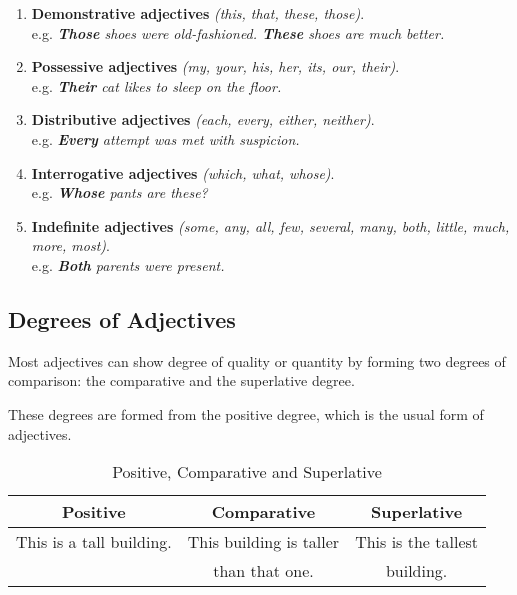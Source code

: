 \documentclass[hidelinks,10pt,a4paper]{article}
\begin{document}
\begin{enumerate}[label=(\alph*)]
	\item \textbf{Demonstrative adjectives} \textit{(this, that, these, those)}. \\
		e.g. \textit{\textbf{Those} shoes were old-fashioned. \textbf{These} shoes are much better.}
	\item \textbf{Possessive adjectives} \textit{(my, your, his, her, its, our, their)}. \\
		e.g. \textit{\textbf{Their} cat likes to sleep on the floor.}
	\item \textbf{Distributive adjectives} \textit{(each, every, either, neither)}. \\
		e.g. \textit{\textbf{Every} attempt was met with suspicion.}
	\item \textbf{Interrogative adjectives} \textit{(which, what, whose)}. \\
		e.g. \textit{\textbf{Whose} pants are these?}
	\item \textbf{Indefinite adjectives} \textit{(some, any, all, few, several, many, both, little, much, more, most)}. \\
		e.g. \textit{\textbf{Both} parents were present.}
\end{enumerate}


\subsection{Degrees of Adjectives}

Most adjectives can show degree of quality or quantity by forming two degrees of comparison: the comparative and the superlative degree.

These degrees are formed from the positive degree, which is the usual form of adjectives.

\begin{table}[h]
\begin{center}
\begin{tabular}{|c|c|c|}
	\hline
	\textbf{Positive} & \textbf{Comparative} & \textbf{Superlative} \\ \hline
	This is a tall building. & This building is taller & This is the tallest \\
	& than that one. & building. \\ \hline
\end{tabular}
\end{center}
\caption{Positive, Comparative and Superlative} \label{tab:pcs}
\end{table}
\end{document}
